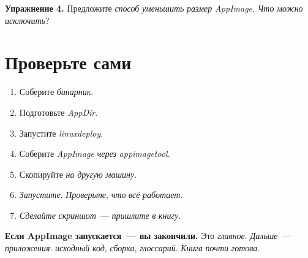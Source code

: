 \begin{exercisebox}
\textbf{Упражнение 4.} Предложите \emph{способ}
\emph{уменьшить} \emph{размер} \emph{AppImage}.
\emph{Что} \emph{можно} \emph{исключить}?
\end{exercisebox}

\section{Проверьте сами}
\label{sec:appimage-check}

\begin{enumerate}
    \item Соберите \emph{бинарник}.
    \item Подготовьте \emph{AppDir}.
    \item Запустите \emph{linuxdeploy}.
    \item Соберите \emph{AppImage} \emph{через}
          \emph{appimagetool}.
    \item Скопируйте \emph{на} \emph{другую} \emph{машину}.
    \item \emph{Запустите}. \emph{Проверьте}, \emph{что}
          \emph{всё} \emph{работает}.
    \item \emph{Сделайте} \emph{скриншот}~--- \emph{пришлите}
          \emph{в} \emph{книгу}.
\end{enumerate}

\begin{ideabox}
\textbf{Если AppImage запускается~--- вы закончили.}
Это \emph{главное}. \emph{Дальше}~--- \emph{приложения}:
\emph{исходный} \emph{код}, \emph{сборка}, \emph{глоссарий}.
\emph{Книга} \emph{почти} \emph{готова}.
\end{ideabox}



